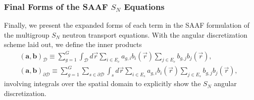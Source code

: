 \subsubsection{Final Forms of the \gls{SAAF} $S_N$ Equations}

Finally, we present the expanded forms of each term in the \gls{SAAF} formulation of the multigroup
$S_N$ neutron transport equations. With the angular discretization scheme laid out, we define the
inner products
%
\begin{gather}
  \left(\bm{a},\bm{b}\right)_\mathcal{D} \equiv \sum^G_{g=1} \int_\mathcal{D}d\vec{r}
  \sum_{i\in E_e}a_{g,i}b_i(\vec{r})\sum_{j\in E_e}b_{g,j}b_j(\vec{r}), \\
  \left(\bm{a},\bm{b}\right)_{\partial\mathcal{D}} \equiv \sum^G_{g=1}
  \sum_{s\in\partial\mathcal{D}}\int_s d\vec{r}\sum_{i\in E_s}a_{g,i}b_i(\vec{r})\sum_{j\in E_s}
  b_{g,j}b_j(\vec{r}),
\end{gather}
%
involving integrals over the spatial domain to explicitly show the $S_N$ angular discretization.

